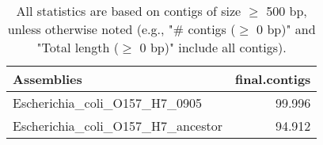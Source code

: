 \documentclass[12pt,a4paper]{article}
\begin{document}
\begin{table}[ht]
\begin{center}
\caption{All statistics are based on contigs of size $\geq$ 500 bp, unless otherwise noted (e.g., "\# contigs ($\geq$ 0 bp)" and "Total length ($\geq$ 0 bp)" include all contigs).}
\begin{tabular}{|l*{1}{|r}|}
\hline
Assemblies & final.contigs \\ \hline
Escherichia\_coli\_O157\_H7\_0905 & 99.996 \\ \hline
Escherichia\_coli\_O157\_H7\_ancestor & 94.912 \\ \hline
\end{tabular}
\end{center}
\end{table}
\end{document}
